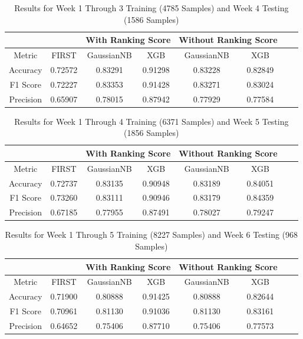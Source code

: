 \documentclass{article}
\begin{document}
\begin{table}[H]
    \caption{Results for Week 1 Through 3 Training (4785 Samples) and Week 4 Testing (1586 Samples)}
    \centering
    \begin{tabular} { |c|c|c|c|c|c|c|c| }
    \hline
    \multicolumn{2}{|c|}{} & \multicolumn{2}{|c|}{With Ranking Score} & \multicolumn{2}{|c|}{Without Ranking Score} \\
    \hline
    Metric & FIRST & GaussianNB & XGB & GaussianNB & XGB \\
    \hline
    Accuracy & 0.72572 & 0.83291 & 0.91298 & 0.83228 & 0.82849 \\
    \hline
    F1 Score & 0.72227 & 0.83353 & 0.91428 & 0.83271 & 0.83024 \\
    \hline
    Precision & 0.65907 & 0.78015 & 0.87942 & 0.77929 & 0.77584 \\
    \hline
    \end{tabular}
    \label{table:results_week_3}
\end{table}

\begin{table}[H]
    \caption{Results for Week 1 Through 4 Training (6371 Samples) and Week 5 Testing (1856 Samples)}
    \centering
    \begin{tabular} { |c|c|c|c|c|c|c|c| }
    \hline
    \multicolumn{2}{|c|}{} & \multicolumn{2}{|c|}{With Ranking Score} & \multicolumn{2}{|c|}{Without Ranking Score} \\
    \hline
    Metric & FIRST & GaussianNB & XGB & GaussianNB & XGB \\
    \hline
    Accuracy & 0.72737 & 0.83135 & 0.90948 & 0.83189 & 0.84051 \\
    \hline
    F1 Score & 0.73260 & 0.83111 & 0.90946 & 0.83179 & 0.84359 \\
    \hline
    Precision & 0.67185 & 0.77955 & 0.87491 & 0.78027 & 0.79247 \\
    \hline
    \end{tabular}
    \label{table:results_week_4}
\end{table}

\begin{table}[H]
    \caption{Results for Week 1 Through 5 Training (8227 Samples) and Week 6 Testing (968 Samples)}
    \centering
    \begin{tabular} { |c|c|c|c|c|c|c|c| }
    \hline
    \multicolumn{2}{|c|}{} & \multicolumn{2}{|c|}{With Ranking Score} & \multicolumn{2}{|c|}{Without Ranking Score} \\
    \hline
    Metric & FIRST & GaussianNB & XGB & GaussianNB & XGB \\
    \hline
    Accuracy & 0.71900 & 0.80888 & 0.91425 & 0.80888 & 0.82644 \\
    \hline
    F1 Score & 0.70961 & 0.81130 & 0.91036 & 0.81130 & 0.83161 \\
    \hline
    Precision & 0.64652 & 0.75406 & 0.87710 & 0.75406 & 0.77573 \\
    \hline
    \end{tabular}
    \label{table:results_week_5}
\end{table}
\end{document}
